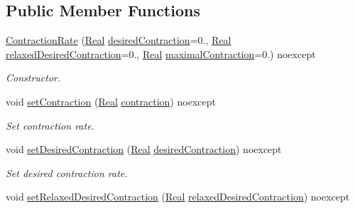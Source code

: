 \subsection*{Public Member Functions}
\begin{DoxyCompactItemize}
\item 
\hyperlink{classSpacy_1_1Mixin_1_1ContractionRate_a3d6b03823ce3951bafd51ceaac732bf7_a3d6b03823ce3951bafd51ceaac732bf7}{Contraction\+Rate} (\hyperlink{classSpacy_1_1Real}{Real} \hyperlink{classSpacy_1_1Mixin_1_1ContractionRate_aaefb97e44b51fb6c8017eb2b40659d64_aaefb97e44b51fb6c8017eb2b40659d64}{desired\+Contraction}=0., \hyperlink{classSpacy_1_1Real}{Real} \hyperlink{classSpacy_1_1Mixin_1_1ContractionRate_a569e3e3766394ccc46a13bd6ca122394_a569e3e3766394ccc46a13bd6ca122394}{relaxed\+Desired\+Contraction}=0., \hyperlink{classSpacy_1_1Real}{Real} \hyperlink{classSpacy_1_1Mixin_1_1ContractionRate_adea1388b1e492db1392f67cbe7e89302_adea1388b1e492db1392f67cbe7e89302}{maximal\+Contraction}=0.) noexcept
\begin{DoxyCompactList}\small\item\em Constructor. \end{DoxyCompactList}\item 
void \hyperlink{classSpacy_1_1Mixin_1_1ContractionRate_ab9215981f0454bd5d641abad582e64e5_ab9215981f0454bd5d641abad582e64e5}{set\+Contraction} (\hyperlink{classSpacy_1_1Real}{Real} \hyperlink{classSpacy_1_1Mixin_1_1ContractionRate_a6c5e653393be91e468364733702e5334_a6c5e653393be91e468364733702e5334}{contraction}) noexcept
\begin{DoxyCompactList}\small\item\em Set contraction rate. \end{DoxyCompactList}\item 
void \hyperlink{classSpacy_1_1Mixin_1_1ContractionRate_a26eaa6344b5b2191931a9fd87ed96f39_a26eaa6344b5b2191931a9fd87ed96f39}{set\+Desired\+Contraction} (\hyperlink{classSpacy_1_1Real}{Real} \hyperlink{classSpacy_1_1Mixin_1_1ContractionRate_aaefb97e44b51fb6c8017eb2b40659d64_aaefb97e44b51fb6c8017eb2b40659d64}{desired\+Contraction}) noexcept
\begin{DoxyCompactList}\small\item\em Set desired contraction rate. \end{DoxyCompactList}\item 
void \hyperlink{classSpacy_1_1Mixin_1_1ContractionRate_ac6e47c0ab683643fea7490703f02632d_ac6e47c0ab683643fea7490703f02632d}{set\+Relaxed\+Desired\+Contraction} (\hyperlink{classSpacy_1_1Real}{Real} \hyperlink{classSpacy_1_1Mixin_1_1ContractionRate_a569e3e3766394ccc46a13bd6ca122394_a569e3e3766394ccc46a13bd6ca122394}{relaxed\+Desired\+Contraction}) noexcept

\end{DoxyCompactItemize}
